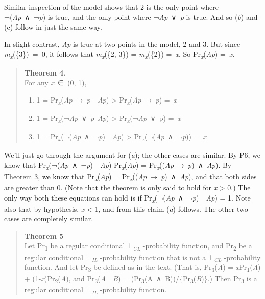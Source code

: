 \documentclass[
  11pt,
  letterpaper,
  DIV=11,
  numbers=noendperiod,
  twoside]{scrartcl}
\providecommand{\tightlist}{%
  \setlength{\itemsep}{0pt}\setlength{\parskip}{0pt}}
\begin{document}
Similar inspection of the model shows that 2 is the only point where
¬(\emph{Ap}~∧~¬\emph{p}) is true, and the only point where
¬\emph{Ap}~∨~\emph{p} is true. And so (\emph{b}) and (c) follow in just
the same way.

In slight contrast, \emph{Ap} is true at two points in the model, 2 and
3. But since \emph{m\textsubscript{x}}(\{3\})~=~0, it follows that
\emph{m\textsubscript{x}}(\{2, 3\}) = \emph{m\textsubscript{x}}(\{2\})
=~\emph{x}. So Pr\textsubscript{\emph{x}}(\emph{Ap}) =~\emph{x}.

\begin{quote}
\textbf{Theorem 4}.\\
For any \emph{x}~∈~(0, 1),

\begin{enumerate}
\def\labelenumi{\alph{enumi}.}
\tightlist
\item
  1 =
  Pr\textsubscript{\emph{x}}(\emph{Ap}~→~\emph{p}~\textbar~\emph{Ap})
  \textgreater{} Pr\textsubscript{\emph{x}}(\emph{Ap}~→~\emph{p})
  =~\emph{x}
\item
  1 =
  Pr\textsubscript{\emph{x}}(¬\emph{Ap}~∨~\emph{p}\textbar~\emph{Ap})
  \textgreater{} Pr\textsubscript{\emph{x}}(¬\emph{Ap}~∨~p) =~\emph{x}
\item
  1 =
  Pr\textsubscript{\emph{x}}(¬(\emph{Ap}~∧~¬\emph{p})~\textbar~\emph{Ap})
  \textgreater{} Pr\textsubscript{\emph{x}}(¬(\emph{Ap}~∧~¬\emph{p}))
  =~\emph{x}
\end{enumerate}
\end{quote}

We'll just go through the argument for (\emph{a}); the other cases are
similar. By P6, we know that
Pr\textsubscript{\emph{x}}(¬(\emph{Ap}~∧~¬\emph{p})~\textbar~\emph{Ap})
Pr\textsubscript{\emph{x}}(\emph{Ap}) =
Pr\textsubscript{\emph{x}}((\emph{Ap}~→~\emph{p})~∧~\emph{Ap}). By
Theorem 3, we know that Pr\textsubscript{\emph{x}}(\emph{Ap}) =
Pr\textsubscript{\emph{x}}((\emph{Ap}~→~\emph{p})~∧~\emph{Ap}), and that
both sides are greater than 0. (Note that the theorem is only said to
hold for \emph{x} \textgreater{} 0.) The only way both these equations
can hold is if
Pr\textsubscript{\emph{x}}(¬(\emph{Ap}~∧~¬\emph{p})~\textbar~\emph{Ap})
= 1. Note also that by hypothesis, \emph{x} \textless{} 1, and from this
claim (\emph{a}) follows. The other two cases are completely similar.

\begin{quote}
\textbf{Theorem 5}\\
Let Pr\textsubscript{1} be a regular conditional
\(\vdash_{CL}\)-probability function, and Pr\textsubscript{2} be a
regular conditional \(\vdash_{IL}\)-probability function that is not a
\(\vdash_{CL}\)-probability function. And let Pr\textsubscript{3} be
defined as in the text. (That is, Pr\textsubscript{3}(\emph{A}) =
\emph{x}Pr\textsubscript{1}(\emph{A}) +
(1-\emph{x})Pr\textsubscript{2}(\emph{A}), and
Pr\textsubscript{3}(\emph{A}~\textbar~\emph{B}) =
(Pr\textsubscript{3}(A~∧~B))/\{Pr\textsubscript{3}(\emph{B})\}.) Then
Pr\textsubscript{3} is a regular conditional \(\vdash_{IL}\)-probability
function.
\end{quote}
\end{document}
